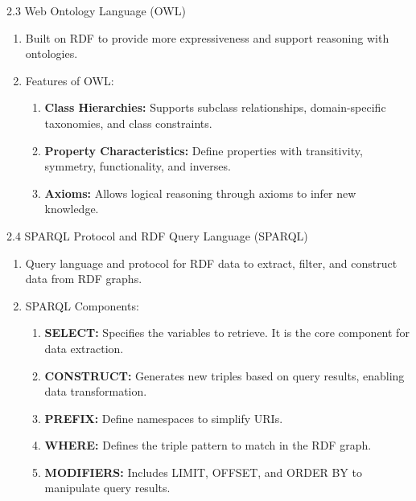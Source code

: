 \begin{frame}{2.3 Web Ontology Language (OWL)}
    \begin{bee}
        \begin{enumerate}[$\bullet$] 
        \item Built on RDF to provide more expressiveness and support reasoning with ontologies.  
        \item Features of OWL:
        \begin{enumerate}[$\bullet$]
            \item \textbf{Class Hierarchies:} Supports subclass relationships, domain-specific taxonomies, and class constraints.  
            \item \textbf{Property Characteristics:} Define properties with transitivity, symmetry, functionality, and inverses.  
            \item \textbf{Axioms:} Allows logical reasoning through axioms to infer new knowledge.  
        \end{enumerate}
    \end{enumerate}
    \end{bee}    
\end{frame}

\begin{frame}{2.4 SPARQL Protocol and RDF Query Language (SPARQL)}
    \begin{bee}
        \begin{enumerate}[$\bullet$]
        \item Query language and protocol for RDF data to extract, filter, and construct data from RDF graphs.  
        \item SPARQL Components:
        \begin{enumerate}[$\bullet$]
            \item \textbf{SELECT:} Specifies the variables to retrieve. It is the core component for data extraction.  
            \item \textbf{CONSTRUCT:} Generates new triples based on query results, enabling data transformation.  
            \item \textbf{PREFIX:} Define namespaces to simplify URIs.  
            \item \textbf{WHERE:} Defines the triple pattern to match in the RDF graph.  
            \item \textbf{MODIFIERS:} Includes LIMIT, OFFSET, and ORDER BY to manipulate query results.  
        \end{enumerate}
    \end{enumerate}
    \end{bee}
\end{frame}

